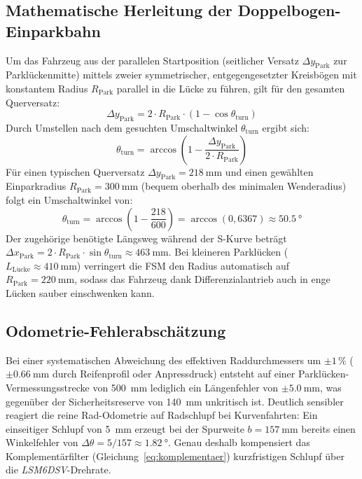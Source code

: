 \subsection{Mathematische Herleitung der Doppelbogen-Einparkbahn}
\label{sec:doppelbogen_mathe}
Um das Fahrzeug aus der parallelen Startposition (seitlicher Versatz $\Delta y_{\mathrm{Park}}$ zur Parklückenmitte) mittels zweier symmetrischer, entgegengesetzter Kreisbögen mit konstantem Radius $R_{\mathrm{Park}}$ parallel in die Lücke zu führen, gilt für den gesamten Querversatz:
\begin{equation}
  \Delta y_{\mathrm{Park}} = 2 \cdot R_{\mathrm{Park}} \cdot (1 - \cos\theta_{\mathrm{turn}})
  \label{eq:doppelbogen_dy}
\end{equation}
Durch Umstellen nach dem gesuchten Umschaltwinkel $\theta_{\mathrm{turn}}$ ergibt sich:
\begin{equation}
  \theta_{\mathrm{turn}} = \arccos\!\left(1 - \frac{\Delta y_{\mathrm{Park}}}{2 \cdot R_{\mathrm{Park}}}\right)
  \label{eq:doppelbogen_theta}
\end{equation}
Für einen typischen Querversatz $\Delta y_{\mathrm{Park}} = \qty{218}{\milli\meter}$ und einen gewählten Einparkradius $R_{\mathrm{Park}} = \qty{300}{\milli\meter}$ (bequem oberhalb des minimalen Wenderadius) folgt ein Umschaltwinkel von:
\begin{equation}
  \theta_{\mathrm{turn}} = \arccos\!\left(1 - \frac{218}{600}\right) = \arccos(0{,}6367) \approx \qty{50,5}{\degree}
  \label{eq:doppelbogen_num}
\end{equation}
Der zugehörige benötigte Längsweg während der S-Kurve beträgt $\Delta x_{\mathrm{Park}} = 2 \cdot R_{\mathrm{Park}} \cdot \sin\theta_{\mathrm{turn}} \approx \qty{463}{\milli\meter}$. Bei kleineren Parklücken ($L_{\mathrm{L\ddot{u}cke}} \approx \qty{410}{\milli\meter}$) verringert die FSM den Radius automatisch auf $R_{\mathrm{Park}} = \qty{220}{\milli\meter}$, sodass das Fahrzeug dank Differenzialantrieb auch in enge Lücken sauber einschwenken kann.

\subsection{Odometrie-Fehlerabschätzung}
Bei einer systematischen Abweichung des effektiven Raddurchmessers um $\pm 1\,\%$ ($\pm \qty{0,66}{\milli\meter}$ durch Reifenprofil oder Anpressdruck) entsteht auf einer Parklücken-Vermessungsstrecke von \qty{500}{\milli\meter} lediglich ein Längenfehler von $\pm \qty{5,0}{\milli\meter}$, was gegenüber der Sicherheitsreserve von \qty{140}{\milli\meter} unkritisch ist. Deutlich sensibler reagiert die reine Rad-Odometrie auf Radschlupf bei Kurvenfahrten: Ein einseitiger Schlupf von \qty{5}{\milli\meter} erzeugt bei der Spurweite $b = \qty{157}{\milli\meter}$ bereits einen Winkelfehler von $\Delta\theta = 5 / 157 \approx \qty{1,82}{\degree}$. Genau deshalb kompensiert das Komplementärfilter (Gleichung~\eqref{eq:komplementaer}) kurzfristigen Schlupf über die \emph{LSM6DSV}-Drehrate.


